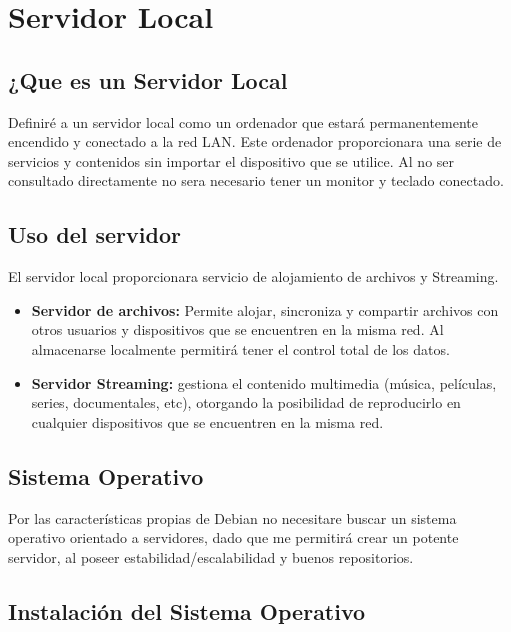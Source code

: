 \chapter{Servidor Local}\label{ch:servidor}

	\section{¿Que es un Servidor Local}
	
		Definiré a un servidor local como un ordenador que estará permanentemente encendido y conectado a la red LAN. Este ordenador proporcionara una serie de servicios y contenidos sin importar el dispositivo que se utilice. Al no ser consultado directamente no sera necesario tener un monitor y teclado conectado.
		
	\section{Uso del servidor}
	
		El servidor local proporcionara servicio de alojamiento de archivos y Streaming.
		
		\begin{itemize}
			
			\item \textbf{Servidor de archivos:} Permite alojar, sincroniza y compartir archivos con otros
			usuarios y dispositivos que se encuentren en la misma red. Al almacenarse localmente permitirá tener el control total de los datos.
			
			\item \textbf{Servidor Streaming:} gestiona el contenido multimedia (música, películas, series,
			documentales, etc), otorgando la posibilidad de reproducirlo en cualquier dispositivos que se encuentren en la misma red.
			
		\end{itemize}
	
	
	\section{Sistema Operativo}
				
			Por las características propias de Debian no necesitare buscar un sistema operativo orientado a 	servidores, dado que me permitirá crear un potente servidor, al poseer estabilidad/escalabilidad y buenos repositorios.\par
		
	\section{Instalación del Sistema Operativo}\label{install}
			
